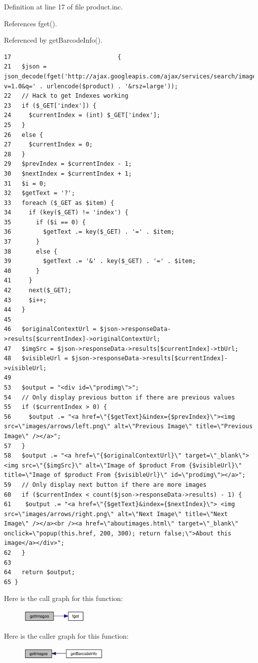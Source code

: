 Definition at line 17 of file product.inc.

References fget().

Referenced by getBarcodeInfo().

\begin{Code}\begin{verbatim}17                              {
21   $json = json_decode(fget('http://ajax.googleapis.com/ajax/services/search/images?v=1.0&q=' . urlencode($product) . '&rsz=large'));
22   // Hack to get Indexes working
23   if ($_GET['index']) {
24     $currentIndex = (int) $_GET['index'];
25   }
26   else {
27     $currentIndex = 0;
28   }
29   $prevIndex = $currentIndex - 1;
30   $nextIndex = $currentIndex + 1;
31   $i = 0;
32   $getText = '?';
33   foreach ($_GET as $item) {
34     if (key($_GET) != 'index') {
35       if ($i == 0) {
36         $getText .= key($_GET) . '=' . $item;
37       }
38       else {
39         $getText .= '&' . key($_GET) . '=' . $item;
40       }
41     }
42     next($_GET);
43     $i++;
44   }
45 
46   $originalContextUrl = $json->responseData->results[$currentIndex]->originalContextUrl;
47   $imgSrc = $json->responseData->results[$currentIndex]->tbUrl;
48   $visibleUrl = $json->responseData->results[$currentIndex]->visibleUrl;
49 
53   $output = "<div id=\"prodimg\">";
54   // Only display previous button if there are previous values
55   if ($currentIndex > 0) {
56     $output .= "<a href=\"{$getText}&index={$prevIndex}\"><img src=\"images/arrows/left.png\" alt=\"Previous Image\" title=\"Previous Image\" /></a>";
57   }
58   $output .= "<a href=\"{$originalContextUrl}\" target=\"_blank\"><img src=\"{$imgSrc}\" alt=\"Image of $product From {$visibleUrl}\" title=\"Image of $product From {$visibleUrl}\" id=\"prodimg\"></a>";
59   // Only display next button if there are more images
60   if ($currentIndex < count($json->responseData->results) - 1) {
61    $output .= "<a href=\"{$getText}&index={$nextIndex}\"> <img src=\"images/arrows/right.png\" alt=\"Next Image\" title=\"Next Image\" /></a><br /><a href=\"aboutimages.html\" target=\"_blank\" onclick=\"popup(this.href, 200, 300); return false;\">About this image</a></div>";
62   }
63 
64   return $output;
65 }
\end{verbatim}
\end{Code}




Here is the call graph for this function:\nopagebreak
\begin{figure}[H]
\begin{center}
\leavevmode
\includegraphics[width=92pt]{product_8inc_9dbb778854cfe105058d7161ca8f058c_cgraph}
\end{center}
\end{figure}


Here is the caller graph for this function:\nopagebreak
\begin{figure}[H]
\begin{center}
\leavevmode
\includegraphics[width=120pt]{product_8inc_9dbb778854cfe105058d7161ca8f058c_icgraph}
\end{center}
\end{figure}
